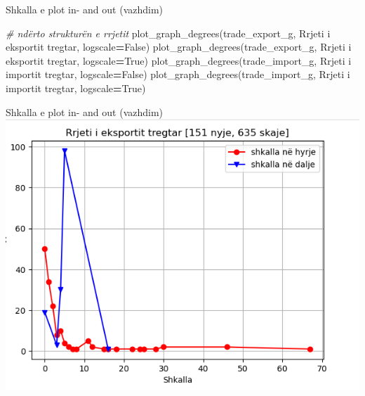 \documentclass[
  ignorenonframetext,
]{beamer}
\newenvironment{Shaded}{\begin{snugshade}}{\end{snugshade}}
\newcommand{\CommentTok}[1]{\textcolor[rgb]{0.56,0.35,0.01}{\textit{#1}}}
\newcommand{\NormalTok}[1]{#1}
\newcommand{\OperatorTok}[1]{\textcolor[rgb]{0.81,0.36,0.00}{\textbf{#1}}}
\newcommand{\StringTok}[1]{\textcolor[rgb]{0.31,0.60,0.02}{#1}}
\newcommand{\VariableTok}[1]{\textcolor[rgb]{0.00,0.00,0.00}{#1}}
\begin{document}
\begin{frame}[fragile]{Shkalla e plot in- and out (vazhdim)}
\protect\hypertarget{shkalla-e-plot-in--and-out-vazhdim-1}{}

\begin{Shaded}
\begin{Highlighting}[]
\CommentTok{\# ndërto strukturën e rrjetit}
\NormalTok{plot\_graph\_degrees(trade\_export\_g, }\StringTok{\textquotesingle{}Rrjeti i eksportit tregtar\textquotesingle{}}\NormalTok{, logscale}\OperatorTok{=}\VariableTok{False}\NormalTok{)}
\NormalTok{plot\_graph\_degrees(trade\_export\_g, }\StringTok{\textquotesingle{}Rrjeti i eksportit tregtar\textquotesingle{}}\NormalTok{, logscale}\OperatorTok{=}\VariableTok{True}\NormalTok{)}
\NormalTok{plot\_graph\_degrees(trade\_import\_g, }\StringTok{\textquotesingle{}Rrjeti i importit tregtar\textquotesingle{}}\NormalTok{, logscale}\OperatorTok{=}\VariableTok{False}\NormalTok{)}
\NormalTok{plot\_graph\_degrees(trade\_import\_g, }\StringTok{\textquotesingle{}Rrjeti i importit tregtar\textquotesingle{}}\NormalTok{, logscale}\OperatorTok{=}\VariableTok{True}\NormalTok{)}
\end{Highlighting}
\end{Shaded}
\end{frame}

\begin{frame}{Shkalla e plot in- and out (vazhdim)}
\protect\hypertarget{shkalla-e-plot-in--and-out-vazhdim-2}{}
\includegraphics{./Figs/trade5.png}
\end{frame}
\end{document}
